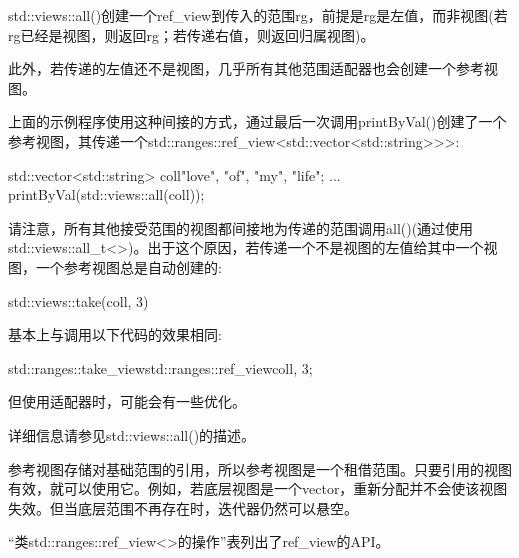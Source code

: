 std::views::all()创建一个ref\_view到传入的范围rg，前提是rg是左值，而非视图(若rg已经是视图，则返回rg；若传递右值，则返回归属视图)。

此外，若传递的左值还不是视图，几乎所有其他范围适配器也会创建一个参考视图。

上面的示例程序使用这种间接的方式，通过最后一次调用printByVal()创建了一个参考视图，其传递一个std::ranges::ref\_view<std::vector<std::string>{}>{}>:

\begin{cpp}
std::vector<std::string> coll{"love", "of", "my", "life"};
...
printByVal(std::views::all(coll));
\end{cpp}

请注意，所有其他接受范围的视图都间接地为传递的范围调用all()(通过使用std::views::all\_t<>)。出于这个原因，若传递一个不是视图的左值给其中一个视图，一个参考视图总是自动创建的:

\begin{cpp}
std::views::take(coll, 3)
\end{cpp}

基本上与调用以下代码的效果相同:

\begin{cpp}
std::ranges::take_view{std::ranges::ref_view{coll}, 3};
\end{cpp}

但使用适配器时，可能会有一些优化。

详细信息请参见std::views::all()的描述。


参考视图存储对基础范围的引用，所以参考视图是一个租借范围。只要引用的视图有效，就可以使用它。例如，若底层视图是一个vector，重新分配并不会使该视图失效。但当底层范围不再存在时，迭代器仍然可以悬空。


“类std::ranges::ref\_view<>的操作”表列出了ref\_view的API。


